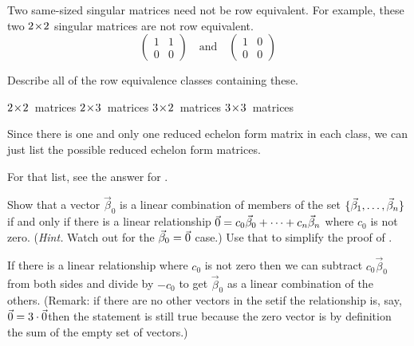 \begin{exercises}
\begin{answer}
      Two same-sized singular matrices need not be row equivalent.
      For example, these two \( 2 \! \times \! 2 \) singular matrices
      are not row equivalent.
      \begin{equation*}
        \begin{pmatrix}
          1  &1  \\
          0  &0
        \end{pmatrix}
        \quad\text{and}\quad
        \begin{pmatrix}
          1  &0  \\
          0  &0
        \end{pmatrix}
      \end{equation*}  
    \end{answer}
  \recommended \item 
    Describe all of the row equivalence classes containing these.
    \begin{exparts*}
      \partsitem \( 2 \! \times \! 2 \)~matrices
      \partsitem \( 2 \! \times \! 3 \)~matrices
      \partsitem \( 3 \! \times \! 2 \)~matrices
      \partsitem \( 3 \! \times \! 3 \)~matrices
    \end{exparts*}
    \begin{answer}
      Since there is one and only one reduced echelon form matrix in each
      class, we can just list the possible reduced echelon form matrices.

      For that list, see the answer for . 
    \end{answer}
  \item  
     \begin{exparts}
          \partsitem Show that a vector $\vec{\beta}_0$ is a linear combination
            of members of the set $\mbox{$\{\vec{\beta}_1,\ldots,\vec{\beta}_n\}$}$
            if and only if there is a linear relationship 
            $\vec{0}=c_0\vec{\beta}_0+\cdots+c_n\vec{\beta}_n$
            where $c_0$ is not zero.
            (\textit{Hint.}   Watch out for the $\vec{\beta}_0=\vec{0}$ case.)
         \partsitem Use that to simplify the proof of 
            .   
       \end{exparts}
       \begin{answer}
          \begin{exparts}
           \partsitem If there is a linear relationship where $c_0$ is not zero
             then we can subtract $c_0\vec{\beta}_0$ from both sides and divide
             by $-c_0$ to get $\vec{\beta}_0$ as a linear
             combination of the others.
             (Remark:  
             if there are no other vectors in the set\Dash if the 
             relationship is, say, 
             $\vec{0}=3\cdot\vec{0}$\Dash then the statement is still true because
             the zero vector is by definition the sum of the empty set 
             of vectors.)


\end{exparts}
\end{answer}
\end{exercises}

